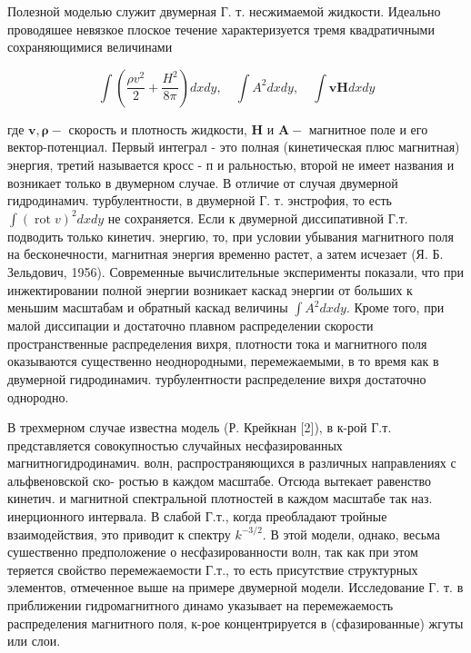 \documentclass[10pt]{article}
\begin{document}
Полезной моделью служит двумерная Г. т. несжимаемой жидкости. Идеально проводяшее невязкое плоское течение характеризуется тремя квадратичными сохраняющимися величинами



\[

\int\left(\frac{\rho v^{2}}{2}+\frac{H^{2}}{8 \pi}\right) d x d y, \quad \int A^{2} d x d y, \quad \int \boldsymbol{v} \boldsymbol{H} d x d y

\]



где $\boldsymbol{v}, \boldsymbol{\rho}-$ скорость и плотность жидкости, $\boldsymbol{H}$ и $\boldsymbol{A}-$ магнитное поле и его вектор-потенциал. Первый интеграл - это полная (кинетическая плюс магнитная) энергия, третий называется кросс - п и ральностью, второй не имеет названия и возникает только в двумерном случае. В отличие от случая двумерной гидродинамич. турбулентности, в двумерной Г. т. энстрофия, то есть $\int(\operatorname{rot} v)^{2} d x d y$ не сохраняется. Если к двумерной диссипативной Г.т. подводить только кинетич. энергию, то, при условии убывания магнитного поля на бесконечности, магнитная энергия временно растет, а затем исчезает (Я. Б. Зельдович, 1956). Современные вычислительные эксперименты показали, что при инжектировании полной энергии возникает каскад энергии от больших к меньшим масштабам и обратный каскад величины $\int A^{2} d x d y$. Кроме того, при малой диссипации и достаточно плавном распределении скорости пространственные распределения вихря, плотности тока и магнитного поля оказываются существенно неоднородными, перемежаемыми, в то время как в двумерной гидродинамич. турбулентности распределение вихря достаточно однородно.



В трехмерном случае известна модель (Р. Крейкнан [2]), в к-рой Г.т. представляется совокупностью случайных несфазированных магнитногидродинамич. волн, распространяющихся в различных направлениях с альфвеновской ско- ростью в каждом масштабе. Отсюда вытекает равенство кинетич. и магнитной спектральной плотностей в каждом масштабе так наз. инерционного интервала. В слабой Г.т., когда преобладают тройные взаимодействия, это приводит к спектру $k^{-3 / 2}$. В этой модели, однако, весьма сушественно предположение о несфазированности волн, так как при этом теряется свойство перемежаемости Г.т., то есть присутствие структурных элементов, отмеченное выше на примере двумерной модели. Исследование Г. т. в приближении гидромагнитного динамо указывает на перемежаемость распределения магнитного поля, к-рое концентрируется в (сфазированные) жгуты или слои.
\end{document}
